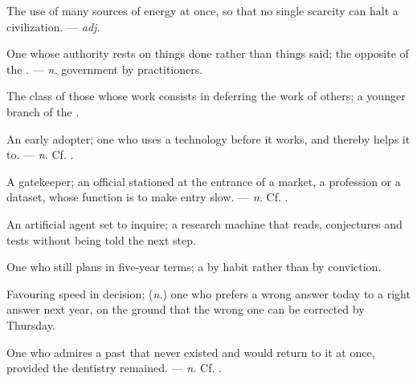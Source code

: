  The use of many sources of energy at once, so that no single scarcity can halt a civilization.  ---  \textit{adj.}

 One whose authority rests on things done rather than things said; the opposite of the . ---  \textit{n.} government by practitioners.

 The class of those whose work consists in deferring the work of others; a younger branch of the .

 An early adopter; one who uses a technology before it works, and thereby helps it to. ---  \textit{n.} Cf. .

 A gatekeeper; an official stationed at the entrance of a market, a profession or a dataset, whose function is to make entry slow. ---  \textit{n.} Cf. .

 An artificial agent set to inquire; a research machine that reads, conjectures and tests without being told the next step.  

 One who still plans in five-year terms; a  by habit rather than by conviction.

 Favouring speed in decision; (\textit{n.}) one who prefers a wrong answer today to a right answer next year, on the ground that the wrong one can be corrected by Thursday.

 One who admires a past that never existed and would return to it at once, provided the dentistry remained. ---  \textit{n.} Cf. .

